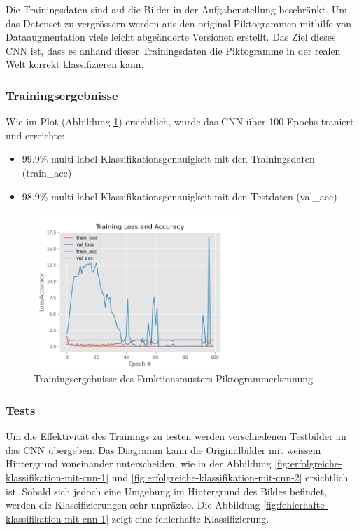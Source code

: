 Die Trainingsdaten sind auf die Bilder in der Aufgabenstellung beschränkt. Um das Datenset zu vergrössern werden aus den original Piktogrammen mithilfe von Dataaugmentation viele leicht abgeänderte Versionen erstellt. Das Ziel dieses CNN ist, dass es anhand dieser Trainingsdaten die Piktogramme in der realen Welt korrekt klassifizieren kann. %

\subsubsection{Trainingsergebnisse}
Wie im Plot (Abbildung \ref{fig:trainingsergebnisse}) ersichtlich, wurde das CNN über 100 Epochs traniert und erreichte:
\begin{itemize}
    \item 99.9\% multi-label Klassifikationsgenauigkeit mit den Trainingsdaten (train\_acc)
    \item 98.9\% multi-label Klassifikationsgenauigkeit mit den Testdaten (val\_acc)
 \end{itemize}
 
\begin{figure}[H]
  \includegraphics[width=0.7\textwidth]{img/piktogrammerkennung/trainingsergebnisse_piktogram.png}
  \centering
  \caption{Trainingsergebnisse des Funktionsmusters Piktogrammerkennung}
  \label{fig:trainingsergebnisse}
\end{figure} 
   
\subsubsection{Tests}
Um die Effektivität des Trainings zu testen werden verschiedenen Testbilder an das CNN übergeben. Das Diagramm kann die Originalbilder mit weissem Hintergrund voneinander unterscheiden, wie in der Abbildung \ref{fig:erfolgreiche-klassifikation-mit-cnn-1} und \ref{fig:erfolgreiche-klassifikation-mit-cnn-2} ersichtlich ist. Sobald sich jedoch eine Umgebung im Hintergrund des Bildes befindet, werden die Klassifizierungen sehr unpräzise. Die Abbildung \ref{fig:fehlerhafte-klassifikation-mit-cnn-1} zeigt eine fehlerhafte Klassifizierung.

